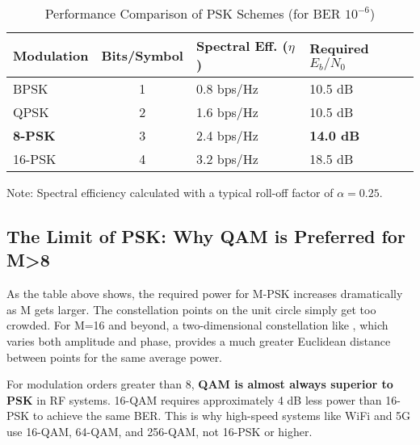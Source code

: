 \begin{table}[H]
    \centering
    \caption{Performance Comparison of PSK Schemes (for BER $10^{-6}$)}
    \label{tab:psk-comparison}
    \begin{tabularx}{\textwidth}{@{}lcXX@{}}
        \toprule
        \tableheaderfont Modulation & \tableheaderfont Bits/Symbol & \tableheaderfont Spectral Eff. ($\eta$) & \tableheaderfont Required $E_b/N_0$ \\
        \midrule
        BPSK & 1 & 0.8 bps/Hz & 10.5 dB \\
        QPSK & 2 & 1.6 bps/Hz & 10.5 dB \\
        \textbf{8-PSK} & 3 & 2.4 bps/Hz & \textbf{14.0 dB} \\
        16-PSK & 4 & 3.2 bps/Hz & 18.5 dB \\
        \bottomrule
    \end{tabularx}
    \par\vspace{0.5em}
    \small Note: Spectral efficiency calculated with a typical roll-off factor of $\alpha=0.25$.
\end{table}


\subsection{The Limit of PSK: Why QAM is Preferred for M>8}

As the table above shows, the required power for M-PSK increases dramatically as M gets larger. The constellation points on the unit circle simply get too crowded. For M=16 and beyond, a two-dimensional constellation like , which varies both amplitude and phase, provides a much greater Euclidean distance between points for the same average power.
\begin{warningbox}
    For modulation orders greater than 8, \textbf{QAM is almost always superior to PSK} in RF systems. 16-QAM requires approximately 4 dB less power than 16-PSK to achieve the same BER. This is why high-speed systems like WiFi and 5G use 16-QAM, 64-QAM, and 256-QAM, not 16-PSK or higher.
\end{warningbox}


